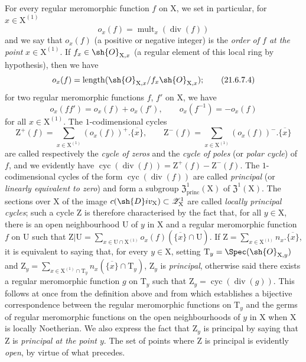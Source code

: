 \begin{env}[21.6.7]
For every regular meromorphic function $f$ on $\mathrm{X}$, we set in particular, for $x\in\mathrm{X}^{(1)}$
\[
\label{IV.21.6.7.3}
  o_x(f)=\operatorname{mult}_x(\operatorname{div}(f))
  \tag{21.6.7.3}
\]
and we say that $o_x(f)$ (a positive or negative integer) is the \emph{order of $f$ at the point} $x\in\mathrm{X}^{(1)}$.
If $f_x\in\sh{O}_{\mathrm{X},x}$ (a regular element of this local ring by hypothesis), then we have
\[
\label{IV.21.6.7.4}
  o_x(f)=\operatorname{length}(\sh{O}_{\mathrm{X},x}/f_x\sh{O}_{\mathrm{X},x});
  \tag{21.6.7.4}
\]
for two regular meromorphic functions $f$, $f'$ on $\mathrm{X}$, we have
\[
\label{IV.21.6.7.5}
  o_x(ff')=o_x(f)+o_x(f'),\qquad o_x(f^{-1})=-o_x(f)
  \tag{21.6.7.5}
\]
for all $x\in\mathrm{X}^{(1)}$.
The $1$-codimensional cycles
\[
  \mathrm{Z}^+(f)=\sum_{x\in\mathrm{X}^{(1)}}(o_x(f))^+.\overline{\{x\}},\qquad
  \mathrm{Z}^-(f)=\sum_{x\in\mathrm{X}^{(1)}}(o_x(f))^-.\overline{\{x\}}
\]
are called respectively the \emph{cycle of zeros} and the \emph{cycle of poles} (or \emph{polar cycle}) of $f$, and we evidently have $\operatorname{cyc}(\operatorname{div}(f))=\mathrm{Z}^+(f)-\mathrm{Z}^-(f)$.
The $1$-codimensional cycles of the form $\operatorname{cyc}(\operatorname{div}(f))$ are called \emph{principal} (or \emph{linearly equivalent to zero}) and form a subgroup $\mathfrak{Z}^1_\mathrm{princ}(\mathrm{X})$ of $\mathfrak{Z}^1(\mathrm{X})$.
The sections over $\mathrm{X}$ of the image $c(\sh{D}iv_\mathrm{X})\subset\mathscr{Z}_\mathrm{X}^1$ are
called \emph{locally principal cycles};
such a cycle $\mathrm{Z}$ is therefore characterised by the fact that, for all $y\in\mathrm{X}$, there is an open neighbourhood $\mathrm{U}$ of $y$ in $\mathrm{X}$ and a regular meromorphic function $f$ on $\mathrm{U}$ such that $\mathrm{Z}|\mathrm{U}=\sum_{x\in\mathrm{U}\cap\mathrm{X}^{(1)}}o_x(f)(\overline{\{x\}}\cap\mathrm{U})$.
If $\mathrm{Z}=\sum_{x\in\mathrm{X}^{(1)}}n_x.\overline{\{x\}}$, it is equivalent to saying that, for every $y\in\mathrm{X}$, setting $\mathrm{T}_y=\Spec(\sh{O}_{\mathrm{X},y})$ and $\mathrm{Z}_y=\sum_{x\in\mathrm{X}^{(1)}\cap\mathrm{T}_y}n_x(\overline{\{x\}}\cap\mathrm{T}_y)$, $\mathrm{Z}_y$ is \emph{principal}, otherwise said there exists a regular meromorphic function $g$ on $\mathrm{T}_y$ such that $\mathrm{Z}_y=\operatorname{cyc}(\operatorname{div}(g))$.
This follows at once from the definition above and from  which establishes a bijective correspondence between the regular meromorphic functions on $\mathrm{T}_y$ and the germs of regular meromorphic functions on the open neighbourhoods of $y$ in $\mathrm{X}$ when $\mathrm{X}$ is locally Noetherian.
We also express the fact that $\mathrm{Z}_y$ is principal by saying that $\mathrm{Z}$ is \emph{principal at the point $y$}.
The set of points where $\mathrm{Z}$ is principal is evidently \emph{open}, by virtue of what precedes.


\end{env}
